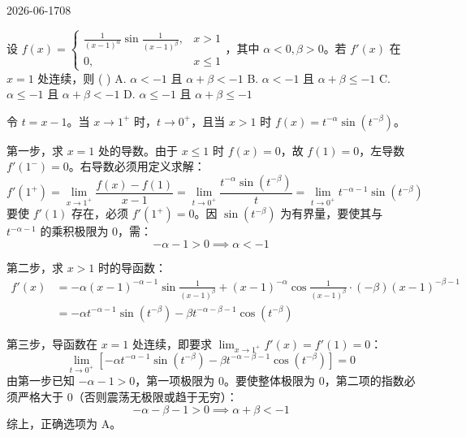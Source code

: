 \begin{mistake}{2026-06-17}{08}

\begin{problemcontent}
设 \( f(x) = \begin{cases} \frac{1}{(x-1)^\alpha} \sin \frac{1}{(x-1)^\beta}, & x > 1 \\ 0, & x \le 1 \end{cases} \)，其中 \(\alpha < 0, \beta > 0\)。若 \(f'(x)\) 在 \(x=1\) 处连续，则 ( )
A. \(\alpha < -1\) 且 \(\alpha + \beta < -1\)
B. \(\alpha < -1\) 且 \(\alpha + \beta \le -1\)
C. \(\alpha \le -1\) 且 \(\alpha + \beta < -1\)
D. \(\alpha \le -1\) 且 \(\alpha + \beta \le -1\)
\end{problemcontent}

\begin{solutioncontent}
令 \(t = x - 1\)。当 \(x \to 1^+\) 时，\(t \to 0^+\)，且当 \(x>1\) 时 \(f(x) = t^{-\alpha} \sin(t^{-\beta})\)。

第一步，求 \(x=1\) 处的导数。由于 \(x \le 1\) 时 \(f(x)=0\)，故 \(f(1)=0\)，左导数 \(f'(1^-)=0\)。右导数必须用定义求解：
\[
f'(1^+) = \lim_{x \to 1^+} \frac{f(x) - f(1)}{x - 1} = \lim_{t \to 0^+} \frac{t^{-\alpha} \sin(t^{-\beta})}{t} = \lim_{t \to 0^+} t^{-\alpha-1} \sin(t^{-\beta})
\]
要使 \(f'(1)\) 存在，必须 \(f'(1^+) = 0\)。因 \(\sin(t^{-\beta})\) 为有界量，要使其与 \(t^{-\alpha-1}\) 的乘积极限为 0，需：
\[
-\alpha - 1 > 0 \implies \alpha < -1
\]

第二步，求 \(x > 1\) 时的导函数：
\[
\begin{aligned}
f'(x) &= -\alpha(x-1)^{-\alpha-1} \sin\frac{1}{(x-1)^\beta} + (x-1)^{-\alpha} \cos\frac{1}{(x-1)^\beta} \cdot (-\beta)(x-1)^{-\beta-1} \\
&= -\alpha t^{-\alpha-1} \sin(t^{-\beta}) - \beta t^{-\alpha-\beta-1} \cos(t^{-\beta})
\end{aligned}
\]

第三步，导函数在 \(x=1\) 处连续，即要求 \(\lim_{x \to 1^+} f'(x) = f'(1) = 0\)：
\[
\lim_{t \to 0^+} \left[ -\alpha t^{-\alpha-1} \sin(t^{-\beta}) - \beta t^{-\alpha-\beta-1} \cos(t^{-\beta}) \right] = 0
\]
由第一步已知 \(-\alpha - 1 > 0\)，第一项极限为 0。要使整体极限为 0，第二项的指数必须严格大于 0（否则震荡无极限或趋于无穷）：
\[
-\alpha - \beta - 1 > 0 \implies \alpha + \beta < -1
\]
综上，正确选项为 A。
\end{solutioncontent}


\end{mistake}
